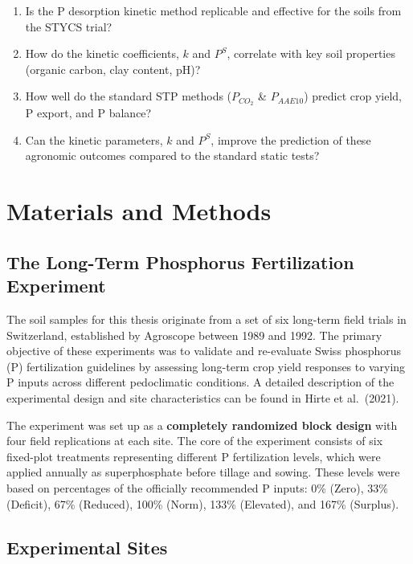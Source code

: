 \documentclass[
  letterpaper,
  DIV=11,
  numbers=noendperiod]{scrartcl}
\providecommand{\tightlist}{%
  \setlength{\itemsep}{0pt}\setlength{\parskip}{0pt}}\usepackage{longtable,booktabs,array}
\begin{document}
\begin{enumerate}
\def\labelenumi{\arabic{enumi}.}
\tightlist
\item
  Is the P desorption kinetic method replicable and effective for the
  soils from the STYCS trial?
\item
  How do the kinetic coefficients, \(k\) and \(P^S\), correlate with key
  soil properties (organic carbon, clay content, pH)?
\item
  How well do the standard STP methods (\(P_{CO_2}\) \& \(P_{AAE10}\))
  predict crop yield, P export, and P balance?
\item
  Can the kinetic parameters, \(k\) and \(P^S\), improve the prediction
  of these agronomic outcomes compared to the standard static tests?
\end{enumerate}

\section{Materials and Methods}\label{materials-and-methods}

\subsection{The Long-Term Phosphorus Fertilization
Experiment}\label{the-long-term-phosphorus-fertilization-experiment}

The soil samples for this thesis originate from a set of six long-term
field trials in Switzerland, established by Agroscope between 1989 and
1992. The primary objective of these experiments was to validate and
re-evaluate Swiss phosphorus (P) fertilization guidelines by assessing
long-term crop yield responses to varying P inputs across different
pedoclimatic conditions. A detailed description of the experimental
design and site characteristics can be found in Hirte et al.~(2021).

The experiment was set up as a \textbf{completely randomized block
design} with four field replications at each site. The core of the
experiment consists of six fixed-plot treatments representing different
P fertilization levels, which were applied annually as superphosphate
before tillage and sowing. These levels were based on percentages of the
officially recommended P inputs: 0\% (Zero), 33\% (Deficit), 67\%
(Reduced), 100\% (Norm), 133\% (Elevated), and 167\% (Surplus).

\subsection{Experimental Sites}\label{experimental-sites}
\end{document}
